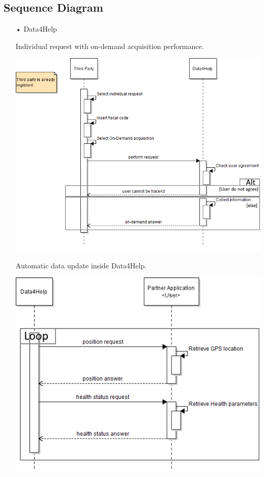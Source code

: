 \subsection{Sequence Diagram}
\begin{enumerate}
\item[•]{\Large Data4Help}



\begin{minipage}{\textwidth}
\FloatBarrier
Individual request with on-demand acquisition performance.
\begin{center}
\includegraphics[scale=0.8]{Images/Seq_Data4Help_onDem.png}
\end{center}
\FloatBarrier

\FloatBarrier
Automatic data update inside Data4Help.
\begin{center}
\includegraphics[scale=0.8]{Images/Seq_Data4Help_autoUp.png}
\end{center}
\FloatBarrier


\end{minipage}
\end{enumerate}
